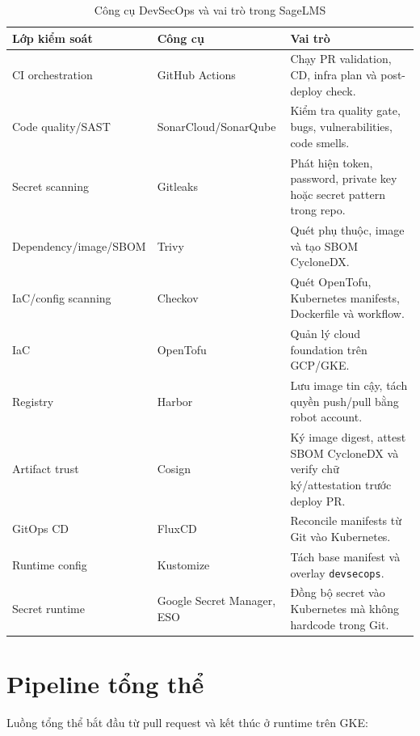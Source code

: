\begin{table}[H]
\centering
\caption{Công cụ DevSecOps và vai trò trong SageLMS}
\label{tab:devsecops-tools}
\begin{tabularx}{\textwidth}{|p{}|p{}|Y|}
\hline
\textbf{Lớp kiểm soát} & \textbf{Công cụ} & \textbf{Vai trò} \\
\hline
CI orchestration & GitHub Actions & Chạy PR validation, CD, infra plan và post-deploy check. \\
Code quality/SAST & SonarCloud/\allowbreak SonarQube & Kiểm tra quality gate, bugs, vulnerabilities, code smells. \\
Secret scanning & Gitleaks & Phát hiện token, password, private key hoặc secret pattern trong repo. \\
Dependency/\allowbreak image/\allowbreak SBOM & Trivy & Quét phụ thuộc, image và tạo SBOM CycloneDX. \\
IaC/config scanning & Checkov & Quét OpenTofu, Kubernetes manifests, Dockerfile và workflow. \\
IaC & OpenTofu & Quản lý cloud foundation trên GCP/GKE. \\
Registry & Harbor & Lưu image tin cậy, tách quyền push/pull bằng robot account. \\
Artifact trust & Cosign & Ký image digest, attest SBOM CycloneDX và verify chữ ký/attestation trước deploy PR. \\
GitOps CD & FluxCD & Reconcile manifests từ Git vào Kubernetes. \\
Runtime config & Kustomize & Tách base manifest và overlay \texttt{devsecops}. \\
Secret runtime & Google Secret Manager, ESO & Đồng bộ secret vào Kubernetes mà không hardcode trong Git. \\
\hline
\end{tabularx}
\end{table}

\section{Pipeline tổng thể}

Luồng tổng thể bắt đầu từ pull request và kết thúc ở runtime trên GKE:

